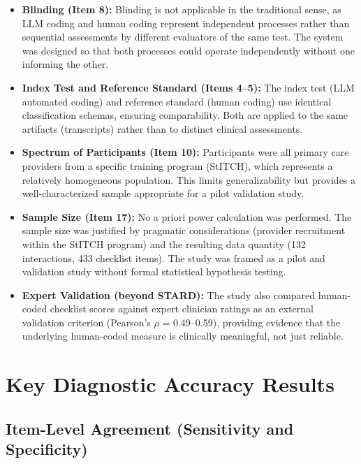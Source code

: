 \documentclass{article}
\begin{document}
\begin{itemize}

\item \textbf{Blinding (Item 8):} Blinding is not applicable in the traditional sense, as LLM coding and human coding represent independent processes rather than sequential assessments by different evaluators of the same test. The system was designed so that both processes could operate independently without one informing the other.

\item \textbf{Index Test and Reference Standard (Items 4--5):} The index test (LLM automated coding) and reference standard (human coding) use identical classification schemas, ensuring comparability. Both are applied to the same artifacts (transcripts) rather than to distinct clinical assessments.

\item \textbf{Spectrum of Participants (Item 10):} Participants were all primary care providers from a specific training program (StITCH), which represents a relatively homogeneous population. This limits generalizability but provides a well-characterized sample appropriate for a pilot validation study.

\item \textbf{Sample Size (Item 17):} No a priori power calculation was performed. The sample size was justified by pragmatic considerations (provider recruitment within the StITCH program) and the resulting data quantity (132 interactions, 433 checklist items). The study was framed as a pilot and validation study without formal statistical hypothesis testing.

\item \textbf{Expert Validation (beyond STARD):} The study also compared human-coded checklist scores against expert clinician ratings as an external validation criterion (Pearson's $\rho$ = 0.49--0.59), providing evidence that the underlying human-coded measure is clinically meaningful, not just reliable.

\end{itemize}

\newpage

\section*{Key Diagnostic Accuracy Results}

\subsection*{Item-Level Agreement (Sensitivity and Specificity)}
\end{document}
